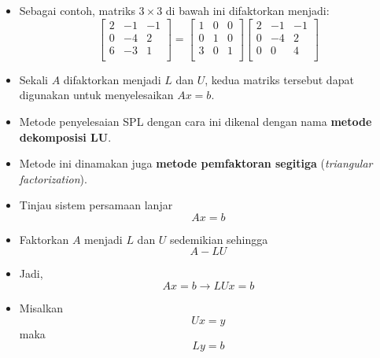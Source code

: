 \documentclass[pdflatex,compress,mathserif]{beamer}
\begin{document}
\begin{frame}
	\begin{itemize}
		\item Sebagai contoh, matriks $3 \times 3$ di bawah ini difaktorkan menjadi:
		\[
		\begin{bmatrix}
			2 & -1 & -1 \\
			0 & -4 & 2 \\
			6 & -3 & 1 \\
		\end{bmatrix}
		=
		\begin{bmatrix}
			1 & 0 & 0 \\
			0 & 1 & 0 \\
			3 & 0 & 1 \\
		\end{bmatrix}
		\begin{bmatrix}
			2 & -1 & -1 \\
			0 & -4 & 2 \\
			0 & 0 & 4 \\
		\end{bmatrix}
		\]
		\item Sekali $ A $ difaktorkan menjadi $ L $ dan $ U $, kedua matriks tersebut dapat digunakan untuk menyelesaikan $ Ax = b $.
		\item Metode penyelesaian SPL dengan cara ini dikenal dengan nama \textbf{metode dekomposisi LU}.
		\item Metode ini dinamakan juga \textbf{metode pemfaktoran segitiga} (\textit{triangular factorization}).
	\end{itemize}
\end{frame}

\begin{frame}
	\begin{itemize}
		\item Tinjau sistem persamaan lanjar \[Ax = b\]
		\item Faktorkan $ A $ menjadi $ L $ dan $ U $ sedemikian sehingga \[ A - LU \]
		\item Jadi, \[Ax = b \rightarrow LUx = b\]
		\item Misalkan \[ Ux = y \]
		maka \[ Ly = b \]
	\end{itemize}
\end{frame}
\end{document}
